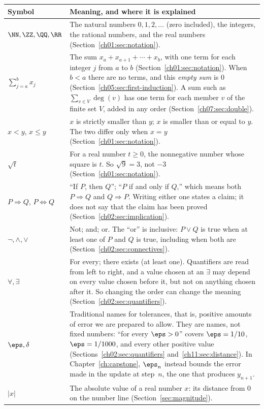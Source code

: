 \begin{longtable}{@{}p{1.25in}p{3.95in}@{}}
\toprule Symbol & Meaning, and where it is explained\\\midrule\endhead
$\NN,\ZZ,\QQ,\RR$ & The natural numbers $0,1,2,\ldots$ (zero included), the integers, the rational numbers, and the real numbers (Section~\ref{ch01:sec:notation}).\\
$\sum_{j=a}^{b}x_j$ & The sum $x_a+x_{a+1}+\cdots+x_b$, with one term for each integer $j$ from $a$ to $b$ (Section~\ref{ch01:sec:notation}). When $b<a$ there are no terms, and this \emph{empty sum} is $0$ (Section~\ref{ch05:sec:first-induction}). A sum such as $\sum_{v\in V}\deg(v)$ has one term for each member $v$ of the finite set $V$, added in any order (Section~\ref{ch07:sec:double}).\\
$x<y$, $x\le y$ & $x$ is strictly smaller than $y$; $x$ is smaller than or equal to $y$. The two differ only when $x=y$ (Section~\ref{ch01:sec:notation}).\\
$\sqrt t$ & For a real number $t\ge0$, the nonnegative number whose square is $t$. So $\sqrt9=3$, not $-3$ (Section~\ref{ch01:sec:notation}).\\
$P\Rightarrow Q$, $P\Leftrightarrow Q$ & ``If $P$, then $Q$''; ``$P$ if and only if $Q$,'' which means both $P\Rightarrow Q$ and $Q\Rightarrow P$. Writing either one states a claim; it does not say that the claim has been proved (Section~\ref{ch02:sec:implication}).\\
$\neg,\land,\lor$ & Not; and; or. The ``or'' is inclusive: $P\lor Q$ is true when at least one of $P$ and $Q$ is true, including when both are (Section~\ref{ch02:sec:connectives}).\\
$\forall,\exists$ & For every; there exists (at least one). Quantifiers are read from left to right, and a value chosen at an $\exists$ may depend on every value chosen before it, but not on anything chosen after it. So changing the order can change the meaning (Section~\ref{ch02:sec:quantifiers}).\\
$\eps,\delta$ & Traditional names for tolerances, that is, positive amounts of error we are prepared to allow. They are names, not fixed numbers: ``for every $\eps>0$'' covers $\eps=1/10$, $\eps=1/1000$, and every other positive value (Sections~\ref{ch02:sec:quantifiers} and~\ref{ch11:sec:distance}). In Chapter~\ref{ch:capstone}, $\eps_n$ instead bounds the error made in the update at step~$n$, the one that produces $y_{n+1}$.\\
$|x|$ & The absolute value of a real number $x$: its distance from $0$ on the number line (Section~\ref{sec:magnitude}).\\

\end{longtable}
